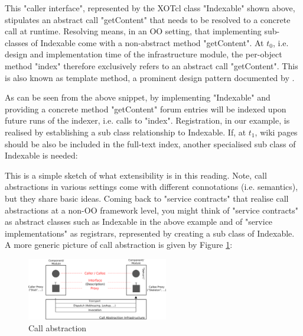 %

%
This "caller interface", represented by the XOTcl class "Indexable" shown above, stipulates an abstract call "getContent" that needs to be resolved to a concrete call at runtime. Resolving means, in an OO setting, that implementing sub-classes of Indexable come with a non-abstract method "getContent". At \begin{math}t_0\end{math}, i.e. design and implementation time of the infrastructure module, the per-object method "index" therefore exclusively refers to an abstract call "getContent". This is also known as template method, a prominent design pattern documented by \cite{gof:1994}.
%

%
As can be seen from the above snippet, by implementing "Indexable" and providing a concrete method "getContent" forum entries will be indexed upon future runs of the indexer, i.e. calls to "index". Registration, in our example, is realised by establishing a sub class relationship to Indexable. If, at \begin{math}t_1\end{math}, wiki pages should be also be included in the full-text index, another specialised sub class of Indexable is needed:
%

%
This is a simple sketch of what extensibility is in this reading. Note,  call abstractions in various settings come with different connotations (i.e. semantics), but they share basic ideas. Coming back to "service contracts" that realise call abstractions at a non-OO framework level, you might think of "service contracts" as abstract classes such as Indexable in the above example and of "service implementations" as registrars, represented by creating a sub class of Indexable. A more generic picture of call abstraction is given by Figure \ref{fig:advanced:ca:1}: 
  \begin{figure}[htbp]
\begin{center}
\includegraphics[width=0.55\textwidth]{img/call-abstraction-scheme.png}
\caption{Call abstraction}
\label{fig:advanced:ca:1}
\end{center}
\end{figure}
